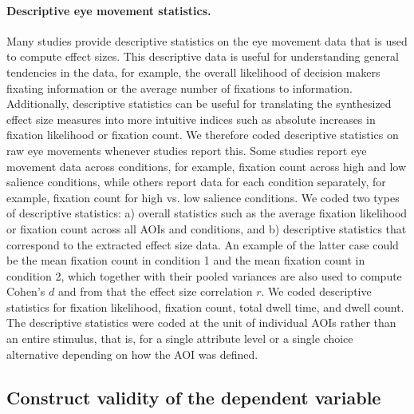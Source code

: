 \paragraph{Descriptive eye movement statistics.} Many studies provide descriptive statistics on the eye movement data that is used to compute effect sizes. This descriptive data is useful for understanding general tendencies in the data, for example, the overall likelihood of decision makers fixating information or the average number of fixations to information. Additionally, descriptive statistics can be useful for translating the synthesized effect size measures into more intuitive indices such as absolute increases in fixation likelihood or fixation count. We therefore coded descriptive statistics on raw eye movements whenever studies report this. Some studies report eye movement data across conditions, for example, fixation count across high and low salience conditions, while others report data for each condition separately, for example, fixation count for high vs. low salience conditions. We coded two types of descriptive statistics: a) overall statistics such as the average fixation likelihood or fixation count across all AOIs and conditions, and b) descriptive statistics that correspond to the extracted effect size data. An example of the latter case could be the mean fixation count in condition 1 and the mean fixation count in condition 2, which together with their pooled variances are also used to compute Cohen's $d$ and from that the effect size correlation $r$. We coded descriptive statistics for fixation likelihood, fixation count, total dwell time, and dwell count. The descriptive statistics were coded at the unit of individual AOIs rather than an entire stimulus, that is, for a single attribute level or a single choice alternative depending on how the AOI was defined.  


\subsection{Construct validity of the dependent variable}

